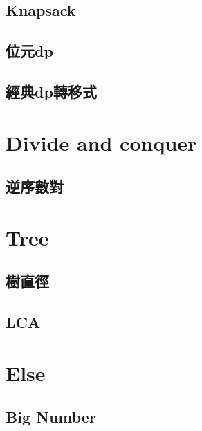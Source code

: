 \subsection{Knapsack}

\subsection{位元dp}

\subsection{經典dp轉移式}


\section{Divide and conquer}
\subsection{逆序數對}


\section{Tree}
\subsection{樹直徑}

\subsection{LCA}


\section{Else}
\subsection{Big Number}
